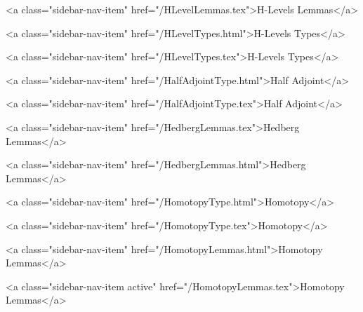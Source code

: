       
        
          <a class="sidebar-nav-item" href="/HLevelLemmas.tex">H-Levels Lemmas</a>
        
      
    
      
        
          <a class="sidebar-nav-item" href="/HLevelTypes.html">H-Levels Types</a>
        
      
    
      
        
          <a class="sidebar-nav-item" href="/HLevelTypes.tex">H-Levels Types</a>
        
      
    
      
        
          <a class="sidebar-nav-item" href="/HalfAdjointType.html">Half Adjoint</a>
        
      
    
      
        
          <a class="sidebar-nav-item" href="/HalfAdjointType.tex">Half Adjoint</a>
        
      
    
      
        
          <a class="sidebar-nav-item" href="/HedbergLemmas.tex">Hedberg Lemmas</a>
        
      
    
      
        
          <a class="sidebar-nav-item" href="/HedbergLemmas.html">Hedberg Lemmas</a>
        
      
    
      
        
          <a class="sidebar-nav-item" href="/HomotopyType.html">Homotopy</a>
        
      
    
      
        
          <a class="sidebar-nav-item" href="/HomotopyType.tex">Homotopy</a>
        
      
    
      
        
          <a class="sidebar-nav-item" href="/HomotopyLemmas.html">Homotopy Lemmas</a>
        
      
    
      
        
          <a class="sidebar-nav-item active" href="/HomotopyLemmas.tex">Homotopy Lemmas</a>
        
      
    
